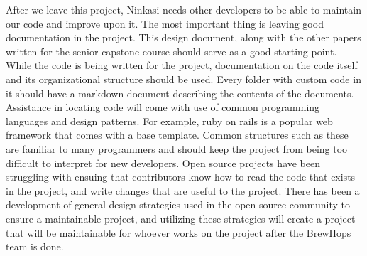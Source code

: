 \documentclass[draftclsnofoot,onecolumn,letterpaper,10pt]{IEEEtran}
\begin{document}
		After we leave this project, Ninkasi needs other developers to be able to maintain our code and improve upon it.
		The most important thing is leaving good documentation in the project.
		This design document, along with the other papers written for the senior capstone course should serve as a good starting point.
		While the code is being written for the project, documentation on the code itself and its organizational structure should be used.
		Every folder with custom code in it should have a markdown document describing the contents of the documents.
		Assistance in locating code will come with use of common programming languages and design patterns.
		For example, ruby on rails is a popular web framework that comes with a base template.
		Common structures such as these are familiar to many programmers and should keep the project from being too difficult to interpret for new developers.
		Open source projects have been struggling with ensuing that contributors know how to read the code that exists in the project, and write changes that are useful to the project.
		There has been a development of general design strategies used in the open source community to ensure a maintainable project, and utilizing these strategies will create a project that will be maintainable for whoever works on the project after the BrewHops team is done.

		\clearpage
\end{document}
